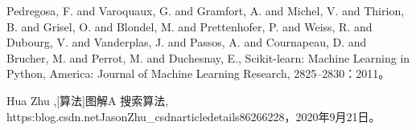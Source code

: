 \documentclass[bwprint]{gmcmthesis}
\begin{document}
\newpage









\newpage
\begin{thebibliography}{99}  
Pedregosa, F. and Varoquaux, G. and Gramfort, A. and Michel, V.
         and Thirion, B. and Grisel, O. and Blondel, M. and Prettenhofer, P.
         and Weiss, R. and Dubourg, V. and Vanderplas, J. and Passos, A. and
         Cournapeau, D. and Brucher, M. and Perrot, M. and Duchesnay, E., Scikit-learn: Machine Learning in {P}ython, America: Journal of Machine Learning Research, 2825--2830：2011。


 Hua Zhu ,[算法]图解A\* 搜索算法, https:\/\/blog.csdn.net\/JasonZhu\_csdn\/article\/details\/86266228，2020年9月21日。

 \end{thebibliography}




% 
% 


\end{document}
